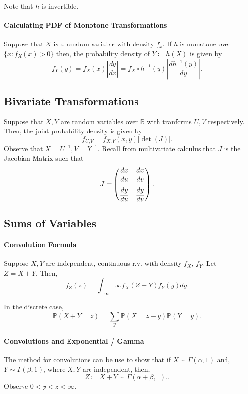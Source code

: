 Note that \( h \) is invertible.

\paragraph{Calculating PDF of Monotone Transformations}
Suppose that \( X \) is a random variable with density \( f_x \).
If \( h \) is monotone over \( \{x : f_X(x) > 0\}  \)
then, the probability density of \( Y \coloneqq h(X)\) 
is given by \[
    f_Y(y) = f_X(x) \left| \frac{dy}{dx} \right| 
    =
    f_X \circ h^{-1} (y) \left| \frac{dh^{-1}(y)}{dy}\right| 
.\]

\subsection{Bivariate Transformations}

Suppose that \( X, Y \) are random variables over \( \mathbb{R} \) with  tranforms
\( U, V \) respectively.
Then, the joint probability density is given by \[
    f_{U, V} = f_{X, Y}(x, y) |\det(J)|
.\]
Observe that \( X = U^{-1}, V = Y^{-1}\). Recall from multivariate
calculus that \( J \) is the Jacobian Matrix such that \[
    J = \begin{pmatrix} 
        \dfrac{dx}{du} & \dfrac{dx}{dv}
                \vspace{3mm}\\
        \dfrac{dy}{du} & \dfrac{dy}{dv}
    \end{pmatrix} 
.\]

\subsection{Sums of Variables}

\paragraph{Convolution Formula}
Suppose \( X, Y \) are independent, continuous r.v. with density  \( f_X \),
\( f_Y \). Let \( Z = X + Y \). Then,  \[
    f_Z(z) = \int_{-\infty}{\infty} f_X(Z - Y) f_Y(y) dy
.\]

In the discrete case, \[
    \mathbb{P}(X + Y = z) = \sum_{y} \mathbb{P}(X = z - y) \mathbb{P}(Y = y)
.\]

\paragraph{Convolutions and Exponential / Gamma}
The method for convolutions can be use to show that if
\( X \sim \Gamma(\alpha , 1) \) and, \( Y \sim \Gamma(\beta, 1) \),
where \( X, Y \) are independent, then, \[
    Z \coloneqq X + Y \sim \Gamma(\alpha  + \beta, 1).
.\]
Observe \( 0 < y < z < \infty \).

